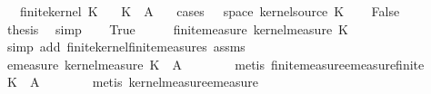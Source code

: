 \begin{isabellebody}
\ \ \ {\isachardoublequoteopen}finite{\isacharunderscore}{\kern0pt}kernel\ K{\isachardoublequoteclose}\isanewline
\ \ \ {\isachardoublequoteopen}K\ {\isasymomega}\ A\ {\isasymnoteq}\ {\isasymtop}{\isachardoublequoteclose}\isanewline
%
\isadelimproof
%
\endisadelimproof
%
\isatagproof
{}\isamarkupfalse%
\ {\isacharparenleft}{\kern0pt}cases\ {\isachardoublequoteopen}{\isasymomega}\ {\isasymin}\ space\ {\isacharparenleft}{\kern0pt}kernel{\isacharunderscore}{\kern0pt}source\ K{\isacharparenright}{\kern0pt}{\isachardoublequoteclose}{\isacharparenright}{\kern0pt}\isanewline
\ \ \isamarkupfalse%
\ False\isanewline
\ \ \isamarkupfalse%
\ \isamarkupfalse%
\ {\isacharquery}{\kern0pt}thesis\ \isamarkupfalse%
\ simp\isanewline
{}\isamarkupfalse%
\isanewline
\ \ \isamarkupfalse%
\ True\isanewline
\ \ \isamarkupfalse%
\ \isamarkupfalse%
\ {\isachardoublequoteopen}finite{\isacharunderscore}{\kern0pt}measure\ {\isacharparenleft}{\kern0pt}kernel{\isacharunderscore}{\kern0pt}measure\ K\ {\isasymomega}{\isacharparenright}{\kern0pt}{\isachardoublequoteclose}\isanewline
\ \ \ \ \isamarkupfalse%
\ {\isacharparenleft}{\kern0pt}simp\ add{\isacharcolon}{\kern0pt}\ finite{\isacharunderscore}{\kern0pt}kernel{\isachardot}{\kern0pt}finite{\isacharunderscore}{\kern0pt}measures\ assms{\isacharparenright}{\kern0pt}\isanewline
\ \ \isamarkupfalse%
\ \isamarkupfalse%
\ {\isachardoublequoteopen}emeasure\ {\isacharparenleft}{\kern0pt}kernel{\isacharunderscore}{\kern0pt}measure\ K\ {\isasymomega}{\isacharparenright}{\kern0pt}\ A\ {\isasymnoteq}\ {\isasymtop}{\isachardoublequoteclose}\isanewline
\ \ \ \ \isamarkupfalse%
\ {\isacharparenleft}{\kern0pt}metis\ finite{\isacharunderscore}{\kern0pt}measure{\isachardot}{\kern0pt}emeasure{\isacharunderscore}{\kern0pt}finite{\isacharparenright}{\kern0pt}\isanewline
\ \ \isamarkupfalse%
\ \isamarkupfalse%
\ {\isachardoublequoteopen}K\ {\isasymomega}\ A\ {\isasymnoteq}\ {\isasymtop}{\isachardoublequoteclose}\isanewline
\ \ \ \ \isamarkupfalse%
\ {\isacharparenleft}{\kern0pt}metis\ kernel{\isacharunderscore}{\kern0pt}measure{\isacharunderscore}{\kern0pt}emeasure{\isacharparenright}{\kern0pt}\isanewline
{}\isamarkupfalse%
%
\endisatagproof
{\isafoldproof}%
%
\isadelimproof
\isanewline
%
\endisadelimproof
\isanewline
{}\isamarkupfalse%

\end{isabellebody}
